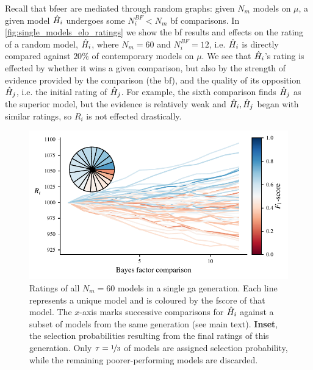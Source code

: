 {Recall that \gls{bfeer} are mediated through random graphs: 
    given $N_m$ models on $\mu$, a given model $\hat{H}_i$ undergoes some 
    $N_i^{BF} < N_m$ \gls{bf} comparisons. 
In \cref{fig:single_models_elo_ratings} we show the \gls{bf} results 
    and effects on the rating of a random model, $\hat{H}_i$, where $N_m=60$ and $N_i^{BF}=12$,
    i.e. $\hat{H}_i$ is directly compared against $20\%$ of contemporary models on $\mu$. 
We see that $\hat{H}_i$'s rating is effected by whether it wins a given comparison, 
    but also by the strength of evidence provided by the comparison (the \gls{bf}), 
    and the quality of its opposition $\hat{H}_j$, i.e. the initial rating of $\hat{H}_j$.
For example, the sixth comparison finds $\hat{H}_j$ as the superior model, 
    but the evidence is relatively weak and $\hat{H}_i, \hat{H}_j$ began with similar ratings, 
    so $R_i$ is not effected drastically. 
\par 

\begin{figure}
    \begin{center}
        \includegraphics{theoretical_study/figures/single_generation_all_ratings.pdf}
    \end{center}
    \caption[Ratings of all models in a single genetic algorithm generation]{
        Ratings of all $N_m=60$ models in a single \acrlong{ga} generation.
        Each line represents a unique model and is coloured by the \gls{fscore} of that model. 
        The $x$-axis marks successive comparisons for $\hat{H}_i$ against a subset of models from the same generation (see main text).
        \textbf{Inset}, the selection probabilities resulting from the final ratings of this generation. 
        Only $\tau=\nicefrac{1}{3}$ of models are assigned selection probability, 
            while the remaining poorer-performing models are discarded. 
        \figtableref
    }
    \label{fig:single_generation_all_ratings}
\end{figure}

}
